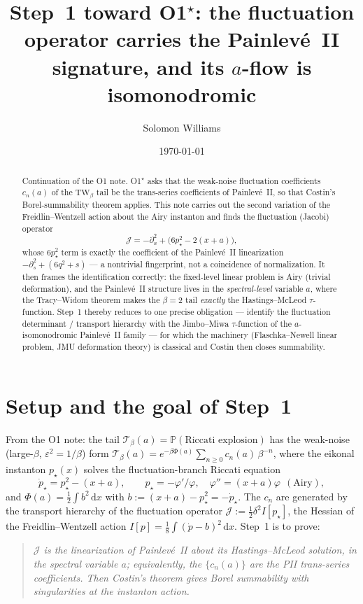 \documentclass[11pt,reqno]{amsart}
\theoremstyle{plain}
\theoremstyle{remark}
\newcommand{\dd}{\,\mathrm{d}}
\newcommand{\Prob}{\mathbb{P}}
\newcommand{\eps}{\varepsilon}
\newcommand{\pinst}{p_\star}
\begin{document}
\title[Step~1: the isomonodromy identification]{Step~1 toward O1$^\star$: the fluctuation
operator carries the Painlev\'e~II signature, and its $a$-flow is isomonodromic}
\author{Solomon Williams}
\date{\today}

\begin{abstract}
Continuation of the O1 note. O1$^\star$ asks that the weak-noise fluctuation coefficients
$c_n(a)$ of the $\mathrm{TW}_\beta$ tail be the trans-series coefficients of Painlev\'e~II, so
that Costin's Borel-summability theorem applies. This note carries out the second variation of the
Freidlin--Wentzell action about the Airy instanton and finds the fluctuation (Jacobi) operator
\[
\mathcal J=-\partial_x^2+\bigl(6\pinst^2-2(x+a)\bigr),
\]
whose $6\pinst^2$ term is exactly the coefficient of the Painlev\'e~II linearization
$-\partial_s^2+(6q^2+s)$ --- a nontrivial fingerprint, not a coincidence of normalization. It then
frames the identification correctly: the fixed-level linear problem is Airy (trivial deformation),
and the Painlev\'e~II structure lives in the \emph{spectral-level} variable $a$, where the
Tracy--Widom theorem makes the $\beta=2$ tail \emph{exactly} the Hastings--McLeod
$\tau$-function. Step~1 thereby reduces to one precise obligation --- identify the fluctuation
determinant / transport hierarchy with the Jimbo--Miwa $\tau$-function of the $a$-isomonodromic
Painlev\'e~II family --- for which the machinery (Flaschka--Newell linear problem, JMU deformation
theory) is classical and Costin then closes summability.
\end{abstract}

\maketitle

\section{Setup and the goal of Step~1}

From the O1 note: the tail $\mathcal T_\beta(a)=\Prob(\text{Riccati explosion})$ has the
weak-noise (large-$\beta$, $\eps^2=1/\beta$) form
$\mathcal T_\beta(a)=e^{-\beta\Phi(a)}\sum_{n\ge0}c_n(a)\,\beta^{-n}$, where the eikonal instanton
$\pinst(x)$ solves the fluctuation-branch Riccati equation
\begin{equation}\label{eq:inst}
\dot\pinst=\pinst^2-(x+a),\qquad \pinst=-\varphi'/\varphi,\quad \varphi''=(x+a)\varphi\ \ (\text{Airy}),
\end{equation}
and $\Phi(a)=\tfrac12\int b^2\dd x$ with $b:=(x+a)-\pinst^2=-\dot\pinst$. The $c_n$ are generated by
the transport hierarchy of the fluctuation operator $\mathcal J:=\tfrac12\delta^2 I[\pinst]$, the
Hessian of the Freidlin--Wentzell action $I[p]=\tfrac18\int(\dot p-b)^2\dd x$. Step~1 is to prove:
\begin{quote}\itshape
$\mathcal J$ is the linearization of Painlev\'e~II about its Hastings--McLeod solution, in the
spectral variable $a$; equivalently, the $\{c_n(a)\}$ are the PII trans-series coefficients. Then
Costin's theorem gives Borel summability with singularities at the instanton action.
\end{quote}
\end{document}
